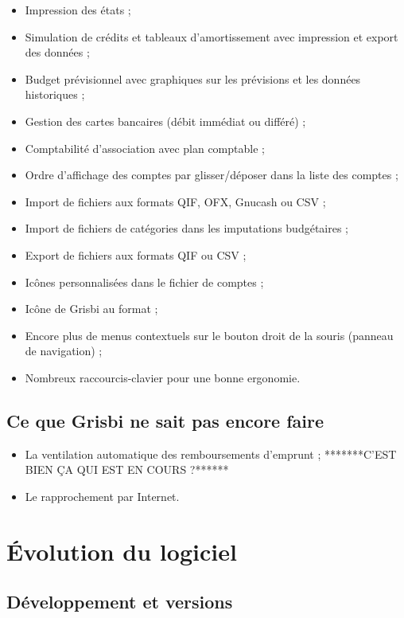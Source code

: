 \begin{itemize}
	\item Impression des états ;
	\item Simulation de crédits et tableaux d'amortissement avec impression et export des données ;
	\item Budget prévisionnel avec graphiques sur les prévisions et les données historiques ;
	\item Gestion des cartes bancaires (débit immédiat ou différé) ;
	\item Comptabilité d'association avec plan comptable ;
	\item Ordre d'affichage des comptes par glisser/déposer dans la liste des comptes ;
	\item Import de fichiers aux formats \gls{QIF}, \gls{OFX}, \gls{Gnucash} ou \gls{CSV} ;
	\item Import de fichiers de catégories dans les imputations budgétaires ;
	\item Export de fichiers aux formats \gls{QIF} ou \gls{CSV} ;
	\item Icônes personnalisées dans le fichier de comptes ;
	\item Icône de Grisbi au format  ;
	\item Encore plus de menus contextuels sur le bouton droit de la souris (panneau de navigation) ;
	\item Nombreux raccourcis-clavier pour une bonne ergonomie.
\end{itemize}


\subsection{Ce que Grisbi ne sait pas encore faire}

\begin{itemize}
	\item La ventilation automatique des remboursements d'emprunt ; *******C'EST BIEN ÇA QUI EST EN COURS ?******
	\item Le rapprochement par Internet.
\end{itemize}


\section{Évolution du logiciel}


\subsection{Développement et versions}

